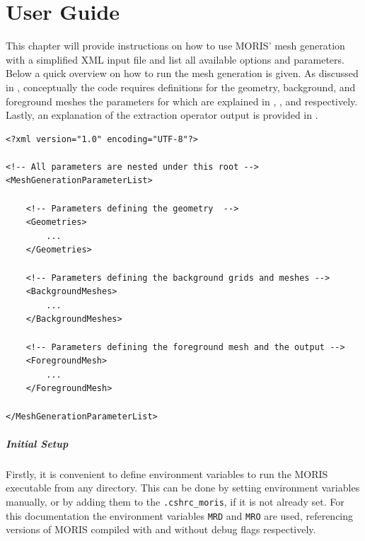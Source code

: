 \chapter{User Guide}
\label{sec:tutorial}

This chapter will provide instructions on how to use MORIS' mesh generation with a simplified XML input file and list all available options and parameters.
Below a quick overview on how to run the mesh generation is given. As discussed in , conceptually the code requires definitions for the geometry, background, and foreground meshes the parameters for which are explained in , , and  respectively. Lastly, an explanation of the extraction operator output is provided in .

\begin{minipage}{\linewidth}
\vspace{0.5cm}
\begin{lstlisting}[caption={Structure of the XML input file},captionpos=b, label={lst:input_structure}]
<?xml version="1.0" encoding="UTF-8"?>

<!-- All parameters are nested under this root -->
<MeshGenerationParameterList>

    <!-- Parameters defining the geometry  -->
    <Geometries>
        ...
    </Geometries>
    
    <!-- Parameters defining the background grids and meshes -->
    <BackgroundMeshes>
        ...
    </BackgroundMeshes>
    
    <!-- Parameters defining the foreground mesh and the output -->
    <ForegroundMesh>
        ...
    </ForegroundMesh>

</MeshGenerationParameterList>
\end{lstlisting}
\end{minipage}

\paragraph{Initial Setup} Firstly, it is convenient to define environment variables to run the MORIS executable from any directory. This can be done by setting environment variables manually, or by adding them to the \texttt{.cshrc\_moris}, if it is not already set. For this documentation the environment variables \texttt{MRD} and \texttt{MRO} are used, referencing versions of MORIS compiled with and without debug flags respectively.  

